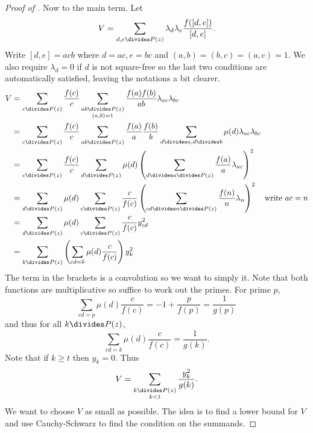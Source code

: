 \documentclass[a4paper]{article}
\begin{document}
\begin{proof}[Proof of ]
  Now to the main term. Let
  \[
    V = \sum_{d, e \divides P(z)} \lambda_d \lambda_e \frac{f([d, e])}{[d, e]}.
  \]
  Write \([d, e] = acb\) where \(d = ac, e = bc\) and \((a, b) = (b, c) = (a, c) = 1\). We also require \(\lambda_d = 0\) if \(d\) is not square-free so the last two conditions are automatically satisfied, leaving the notations a bit clearer.
  \begin{align*}
    V
    &= \sum_{c \divides P(z)} \frac{f(c)}{c} \sum_{\substack{ab \divides P(z) \\ (a, b) = 1}} \frac{f(a)f(b)}{ab} \lambda_{ac} \lambda_{bc} \\
    &= \sum_{c \divides P(z)} \frac{f(c)}{c} \sum_{ab \divides P(z)} \frac{f(a)}{a} \frac{f(b)}{b} \sum_{d \divides a, d \divides b} \mu(d) \lambda_{ac} \lambda_{bc} \\
    &= \sum_{c \divides P(z)} \frac{f(c)}{c} \sum_{d \divides P(z)} \mu(d) \left( \sum_{d \divides a \divides P(z)} \frac{f(a)}{a} \lambda_{ac} \right)^2 \\
    &= \sum_{d \divides P(z)} \mu(d) \sum_{c \divides P(z)} \frac{c}{f(c)} \left( \sum_{cd \divides n \divides P(z)} \frac{f(n)}{n} \lambda_n \right)^2 \quad \text{write \(ac = n\)} \\
    &= \sum_{d \divides P(z)} \mu(d) \sum_{c \divides P(z)} \frac{c}{f(c)} y^2_{cd} \\
    &= \sum_{k \divides P(z)} \left( \sum_{cd = k} \mu(d) \frac{c}{f(c)} \right) y_k^2
  \end{align*}
  The term in the brackets is a convolution so we want to simply it. Note that both functions are multiplicative so suffice to work out the primes. For prime \(p\),
  \[
    \sum_{cd = p} \mu(d) \frac{c}{f(c)}
    = -1 + \frac{p}{f(p)} = \frac{1}{g(p)}
  \]
  and thus for all \(k \divides P(z)\),
  \[
    \sum_{cd = k} \mu(d) \frac{c}{f(c)} = \frac{1}{g(k)}.
  \]
  Note that if \(k \geq t\) then \(y_k = 0\). Thus
  \[
    V = \sum_{\substack{k \divides P(z) \\ k < t}} \frac{y_k^2}{g(k)}.
  \]
  We want to choose \(V\) as small as possible. The idea is to find a lower bound for \(V\) and use Cauchy-Schwarz to find the condition on the summands.


\end{proof}
\end{document}
